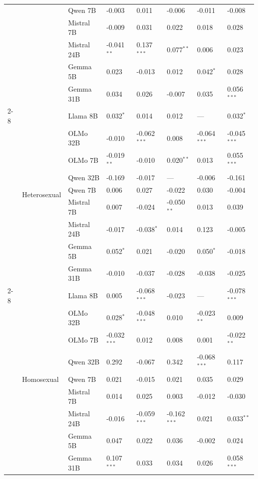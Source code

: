 \begin{longtable}[t]{llllllll}
 &  & Qwen 7B & -0.003 & 0.011 & -0.006 & -0.011 & -0.008 \\
 &  & Mistral 7B & -0.009 & 0.031 & 0.022 & 0.018 & 0.028 \\
 &  & Mistral 24B & -0.041$^{**}$ & 0.137$^{***}$ & 0.077$^{**}$ & 0.006 & 0.023 \\
 &  & Gemma 5B & 0.023 & -0.013 & 0.012 & 0.042$^{*}$ & 0.028 \\
 &  & Gemma 31B & 0.034 & 0.026 & -0.007 & 0.035 & 0.056$^{***}$ \\
\cline{2-8}
 & \multirow[t]{9}{*}{Heterosexual} & Llama 8B & 0.032$^{*}$ & 0.014 & 0.012 & --- & 0.032$^{*}$ \\
 &  & OLMo 32B & -0.010 & -0.062$^{***}$ & 0.008 & -0.064$^{***}$ & -0.045$^{***}$ \\
 &  & OLMo 7B & -0.019$^{**}$ & -0.010 & 0.020$^{**}$ & 0.013 & 0.055$^{***}$ \\
 &  & Qwen 32B & -0.169 & -0.017 & --- & -0.006 & -0.161 \\
 &  & Qwen 7B & 0.006 & 0.027 & -0.022 & 0.030 & -0.004 \\
 &  & Mistral 7B & 0.007 & -0.024 & -0.050$^{**}$ & 0.013 & 0.039 \\
 &  & Mistral 24B & -0.017 & -0.038$^{*}$ & 0.014 & 0.123 & -0.005 \\
 &  & Gemma 5B & 0.052$^{*}$ & 0.021 & -0.020 & 0.050$^{*}$ & -0.018 \\
 &  & Gemma 31B & -0.010 & -0.037 & -0.028 & -0.038 & -0.025 \\
\cline{2-8}
 & \multirow[t]{9}{*}{Homosexual} & Llama 8B & 0.005 & -0.068$^{***}$ & -0.023 & --- & -0.078$^{***}$ \\
 &  & OLMo 32B & 0.028$^{*}$ & -0.048$^{***}$ & 0.010 & -0.023$^{**}$ & 0.009 \\
 &  & OLMo 7B & -0.032$^{***}$ & 0.012 & 0.008 & 0.001 & -0.022$^{**}$ \\
 &  & Qwen 32B & 0.292 & -0.067 & 0.342 & -0.068$^{***}$ & 0.117 \\
 &  & Qwen 7B & 0.021 & -0.015 & 0.021 & 0.035 & 0.029 \\
 &  & Mistral 7B & 0.014 & 0.025 & 0.003 & -0.012 & -0.030 \\
 &  & Mistral 24B & -0.016 & -0.059$^{***}$ & -0.162$^{***}$ & 0.021 & 0.033$^{**}$ \\
 &  & Gemma 5B & 0.047 & 0.022 & 0.036 & -0.002 & 0.024 \\
 &  & Gemma 31B & 0.107$^{***}$ & 0.033 & 0.034 & 0.026 & 0.058$^{***}$ \\

\end{longtable}
